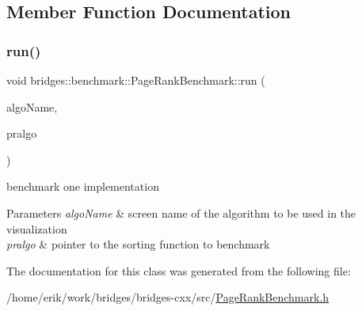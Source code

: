 \subsection{Member Function Documentation}
\mbox{\label{classbridges_1_1benchmark_1_1_page_rank_benchmark_a090873837a04f96bb0349471ffca7cfa}} 
\subsubsection{\texorpdfstring{run()}{run()}}
{\footnotesize\ttfamily void bridges\+::benchmark\+::\+Page\+Rank\+Benchmark\+::run (\begin{DoxyParamCaption}\item[{std\+::string}]{algo\+Name,  }\item[{void($\ast$)(const \hyperlink{classbridges_1_1datastructure_1_1_graph_adj_list}{Graph\+Adj\+List}$<$ std\+::string $>$ \&gr, std\+::unordered\+\_\+map$<$ std\+::string, double $>$ \&out)}]{pralgo }\end{DoxyParamCaption})\hspace{0.3cm}{\ttfamily [inline]}}



benchmark one implementation 


\begin{DoxyParams}{Parameters}
{\em algo\+Name} & screen name of the algorithm to be used in the visualization \\
\hline
{\em pralgo} & pointer to the sorting function to benchmark \\
\hline
\end{DoxyParams}


The documentation for this class was generated from the following file\+:\begin{DoxyCompactItemize}
\item 
/home/erik/work/bridges/bridges-\/cxx/src/\hyperlink{_page_rank_benchmark_8h}{Page\+Rank\+Benchmark.\+h}\end{DoxyCompactItemize}
